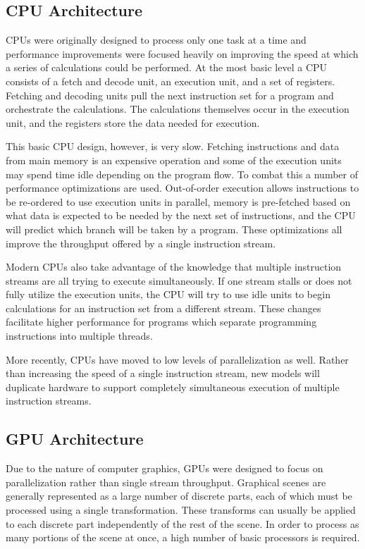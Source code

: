 \subsection{CPU Architecture}

CPUs were originally designed to process only one task at a time and performance improvements were focused heavily on improving the speed at which a series of calculations could be performed. At the most basic level a CPU consists of a fetch and decode unit, an execution unit, and a set of registers. Fetching and decoding units pull the next instruction set for a program and orchestrate the calculations. The calculations themselves occur in the execution unit, and the registers store the data needed for execution. \cite{GPGPU}

This basic CPU design, however, is very slow. Fetching instructions and data from main memory is an expensive operation and some of the execution units may spend time idle depending on the program flow. To combat this a number of performance optimizations are used. Out-of-order execution allows instructions to be re-ordered to use execution units in parallel, memory is pre-fetched based on what data is expected to be needed by the next set of instructions, and the CPU will predict which branch will be taken by a program. These optimizations all improve the throughput offered by a single instruction stream.

Modern CPUs also take advantage of the knowledge that multiple instruction streams are all trying to execute simultaneously. If one stream stalls or does not fully utilize the execution units, the CPU will try to use idle units to begin calculations for an instruction set from a different stream. These changes facilitate higher performance for programs which separate programming instructions into multiple threads.

More recently, CPUs have moved to low levels of parallelization as well. Rather than increasing the speed of a single instruction stream, new models will duplicate hardware to support completely simultaneous execution of multiple instruction streams.

\subsection{GPU Architecture}

Due to the nature of computer graphics, GPUs were designed to focus on parallelization rather than single stream throughput. Graphical scenes are generally represented as a large number of discrete parts, each of which must be processed using a single transformation. These transforms can usually be applied to each discrete part independently of the rest of the scene. In order to process as many portions of the scene at once, a high number of basic processors is required. \cite{GPGPU}

